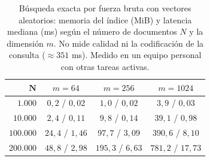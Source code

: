 \begin{table}[htbp]
\centering
\footnotesize
\setlength{\tabcolsep}{5pt}
\renewcommand{\arraystretch}{1.25}
\caption{Búsqueda exacta por fuerza bruta con vectores aleatorios: memoria del índice (MiB) y latencia mediana (ms) según el número de documentos $N$ y la dimensión $m$. No mide calidad ni la codificación de la consulta ($\approx 351$ ms). Medido en un equipo personal con otras tareas activas.}
\label{tab:escalamiento}
\begin{tabularx}{\textwidth}{@{}r c c c @{}}
\toprule
$\boldsymbol{N}$ & \textbf{$m=64$} & \textbf{$m=256$} & \textbf{$m=1024$} \\
\midrule
$1.000$ & $0{,}2$ / $0{,}02$ & $1{,}0$ / $0{,}02$ & $3{,}9$ / $0{,}03$ \\
$10.000$ & $2{,}4$ / $0{,}11$ & $9{,}8$ / $0{,}14$ & $39{,}1$ / $0{,}98$ \\
$100.000$ & $24{,}4$ / $1{,}46$ & $97{,}7$ / $3{,}09$ & $390{,}6$ / $8{,}10$ \\
$200.000$ & $48{,}8$ / $2{,}98$ & $195{,}3$ / $6{,}63$ & $781{,}2$ / $17{,}73$ \\
\bottomrule
\end{tabularx}
\end{table}

